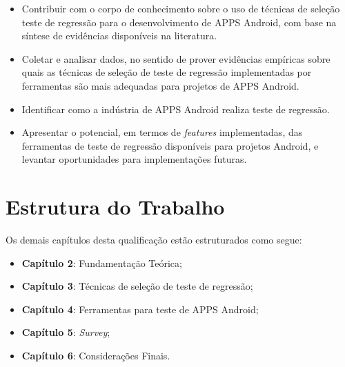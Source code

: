 \begin{itemize}

    \item Contribuir com o corpo de conhecimento sobre o uso de técnicas de seleção teste de regressão para o desenvolvimento de \ac{APPS} Android, com base na síntese de evidências disponíveis na literatura.
    
    \item Coletar e analisar dados, no sentido de prover evidências empíricas sobre quais as técnicas de seleção de teste de regressão implementadas por ferramentas são mais adequadas para projetos de \ac{APPS} Android.
    
    \item Identificar como a indústria de \ac{APPS} Android realiza teste de regressão.
    
    \item Apresentar o potencial, em termos de \textit{features} implementadas, das ferramentas de teste de regressão disponíveis para projetos Android, e levantar oportunidades para implementações futuras.

\end{itemize}


\section{Estrutura do Trabalho}\label{sec:estruturadotrabalho}

Os demais capítulos desta qualificação estão estruturados como segue: 
\begin{itemize}
\item \textbf{Capítulo 2}: Fundamentação Teórica;
\item \textbf{Capítulo 3}: Técnicas de seleção de teste de regressão;
\item \textbf{Capítulo 4}: Ferramentas para teste de \ac{APPS} Android;
\item \textbf{Capítulo 5}: \textit{Survey};
\item \textbf{Capítulo 6}: Considerações Finais.
\end{itemize}
